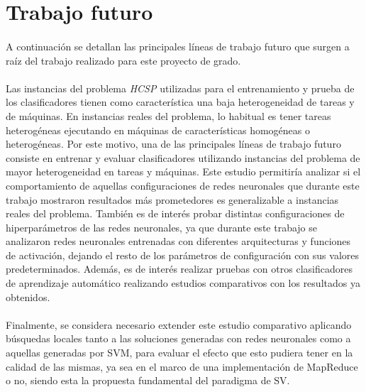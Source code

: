 \section{Trabajo futuro}

\paragraph{}A continuación se detallan las principales líneas de trabajo futuro que surgen a raíz del trabajo realizado para este proyecto de grado.

\paragraph{}Las instancias del problema \textit{HCSP} utilizadas para el entrenamiento y prueba de los clasificadores tienen como característica una baja heterogeneidad de tareas y de máquinas. En instancias reales del problema, lo habitual es tener tareas heterogéneas ejecutando en máquinas de características homogéneas o heterogéneas.
Por este motivo, una de las principales líneas de trabajo futuro consiste en entrenar y evaluar clasificadores utilizando instancias del problema de mayor heterogeneidad en tareas y máquinas.
Este estudio permitiría analizar si el comportamiento de aquellas configuraciones de redes neuronales que durante este trabajo mostraron resultados más prometedores es generalizable a instancias reales del problema.
También es de interés probar distintas configuraciones de hiperparámetros de las redes neuronales, ya que durante este trabajo se analizaron redes neuronales entrenadas con diferentes arquitecturas y funciones de activación, dejando el resto de los parámetros de configuración con sus valores predeterminados. Además, es de interés realizar pruebas con otros clasificadores de aprendizaje automático realizando estudios comparativos con los resultados ya obtenidos.

\paragraph{}Finalmente, se considera necesario extender este estudio comparativo aplicando búsquedas locales tanto a las soluciones generadas con redes neuronales como a aquellas generadas por SVM, para evaluar el efecto que esto pudiera tener en la calidad de las mismas, ya sea en el marco de una implementación de MapReduce o no, siendo esta la propuesta fundamental del paradigma de SV.

